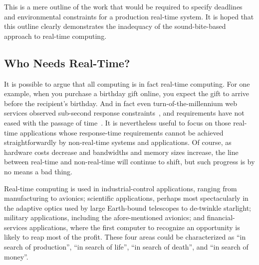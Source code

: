 This is a mere outline of the work that would be required to specify
deadlines and environmental constraints for a production real-time system.
It is hoped that this outline clearly demonstrates the inadequacy of
the sound-bite-based approach to real-time computing.

\subsection{Who Needs Real-Time?}
\label{sec:advsync:Who Needs Real-Time?}

It is possible to argue that all computing is in fact real-time computing.
For one example, when you purchase a birthday gift online, you expect
the gift to arrive before the recipient's birthday.
And in fact even turn-of-the-millennium web services observed sub-second
response constraints~\cite{KristofferBohmann2001a}, and requirements have
not eased with the passage of time~\cite{DeCandia:2007:DAH:1323293.1294281}.
It is nevertheless useful to focus on those real-time applications
whose response-time requirements cannot be achieved straightforwardly
by non-real-time systems and applications.
Of course, as hardware costs decrease and bandwidths and memory sizes
increase, the line between real-time and non-real-time will continue
to shift, but such progress is by no means a bad thing.

\QuickQuizEnd

Real-time computing is used in industrial-control applications, ranging from
manufacturing to avionics;
scientific applications, perhaps most spectacularly in the adaptive
optics used by
large Earth-bound telescopes to de-twinkle starlight;
military applications, including the afore-mentioned avionics;
and financial-services applications, where the first computer to recognize
an opportunity is likely to reap most of the profit.
These four areas could be characterized as ``in search of production'',
``in search of life'', ``in search of death'', and ``in search of money''.

